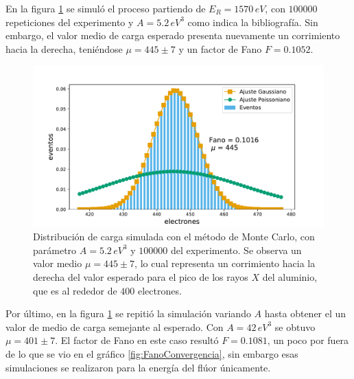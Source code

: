 En la figura \ref{fig:Al_fano_A5.2} se simuló el proceso partiendo de $E_{R} = 1570\,\si{eV}$, con $100000$ repeticiones del experimento y $A = 5.2\,\si{eV}^{3}$ como indica la bibliografía. Sin embargo, el valor medio de carga esperado presenta nuevamente un corrimiento hacia la derecha, teniéndose $\mu = 445 \pm 7$ y un factor de Fano $F = 0.1052$.
\begin{figure}%
    \centering
    \includegraphics[scale=0.5]{Figs/Al_Fano_1570_A5.2_Eloss0_100ktrials.pdf}
    \caption{\footnotesize{Distribución de carga simulada con el método de Monte Carlo, con parámetro $A = 5.2\,\si{eV}^{3}$ y $100000$ del experimento. Se observa un valor medio $\mu = 445 \pm 7$, lo cual representa un corrimiento hacia la derecha del valor esperado para el pico de los rayos $X$ del aluminio, que es al rededor de $400$ electrones.}}
    \label{fig:Al_fano_A5.2}
\end{figure}
Por último, en la figura \ref{fig:Al_fano_A5.2} se repitió la simulación variando $A$ hasta obtener el un valor de medio de carga semejante al esperado. Con $A = 42\,\si{eV}^{3}$ se obtuvo $\mu = 401 \pm 7$. El factor de Fano en este caso resultó $F = 0.1081$, un poco por fuera de lo que se vio en el gráfico \ref{fig:FanoConvergencia}, sin embargo esas simulaciones se realizaron para la energía del flúor únicamente.

